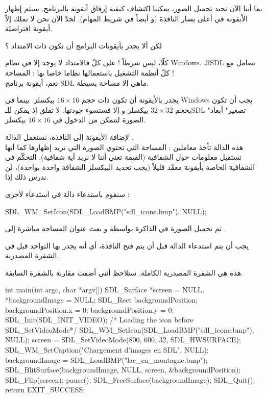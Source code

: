 بما أننا الآن نجيد تحميل الصور، يمكننا اكتشاف كيفية إرفاق أيقونة بالبرنامج. سيتم إظهار الأيقونة في أعلى يسار النافذة (و أيضاً في شريط المهام). لحدّ الآن نحن لا نملك إلاّ أيقونة افتراضيّة.

\begin{question}
لكن ألا يجدر بأيقونات البرامج أن تكون ذات الامتداد
 ؟
\end{question}

كلّا، ليس شرطاً ! على كلّ فالامتداد
لا يوجد إلا في نظام
\textenglish{Windows}.
 الـ\textenglish{SDL}
تتعامل مع كلّ أنظمة التشغيل باستعمالها نظاما خاصا بها : المساحة !\\
نعم، أيقونة برنامج 
\textenglish{SDL}
ماهي إلا مساحة بسيطة.

\begin{warning}
يجدر بالأيقونة أن تكون ذات حجم 
$16 \times 16$
بيكسلز. بينما في 
\textenglish{Windows}
يجب أن تكون بحجم
$32 \times 32$
بيكسلز و إلا فستسوء جودتها. لا تقلق إذ يمكن للـ\textenglish{SDL}
"تصغير" أبعاد الصورة لتتمكن من الدخول في 
$16 \times 16$
بيكسلز.
\end{warning}

لإضافة الأيقونة إلى النافذة، نستعمل الدالة 
.\\
هذه الدالة تأخذ معاملين : المساحة التي تحتوي الصورة التي نريد إظهارها كما أنها تستقبل معلومات حول الشفافية (القيمة 
تعني أننا لا نريد أية شفافية). التحكّم في الشفافية الخاصة بأيقونة معقّد قليلاً (يجب تحديد البيكسلز الشفافة واحدة بواحدة)، لن ندرس ذلك إذا.

سنقوم باستدعاء دالة في استدعاء لأخرى :

\begin{Csource}
SDL_WM_SetIcon(SDL_LoadBMP("sdl_icone.bmp"), NULL);
\end{Csource}
 
تم تحميل الصورة في الذاكرة بواسطة
و بعث عنوان المساحة مباشرة إلى
.

\begin{critical}
يجب أن يتم استدعاء الدالة
قبل أن يتم فتح النافذة، أي أنه يجدر بها التواجد قبل
في الشفرة المصدرية.
\end{critical}

هذه هي الشفرة المصدرية الكاملة. ستلاحظ أنني أضفت
مقارنة بالشفرة السابقة.

\begin{Csource}
int main(int argc, char *argv[])
{
	SDL_Surface *screen = NULL, *backgroundImage = NULL;
	SDL_Rect backgroundPosition;
	backgroundPosition.x = 0;
	backgroundPosition.y = 0;
	SDL_Init(SDL_INIT_VIDEO);
	/* Loading the icon before SDL_SetVideoMode*/
	SDL_WM_SetIcon(SDL_LoadBMP("sdl_icone.bmp"), NULL);
	screen = SDL_SetVideoMode(800, 600, 32, SDL_HWSURFACE);
	SDL_WM_SetCaption("Chargement d'images en SDL", NULL);
	backgroundImage = SDL_LoadBMP("lac_en_montagne.bmp");
	SDL_BlitSurface(backgroundImage, NULL, screen, &backgroundPosition);
	SDL_Flip(screen);
	pause();
	SDL_FreeSurface(backgroundImage);
	SDL_Quit();
	return EXIT_SUCCESS;
}
\end{Csource}

